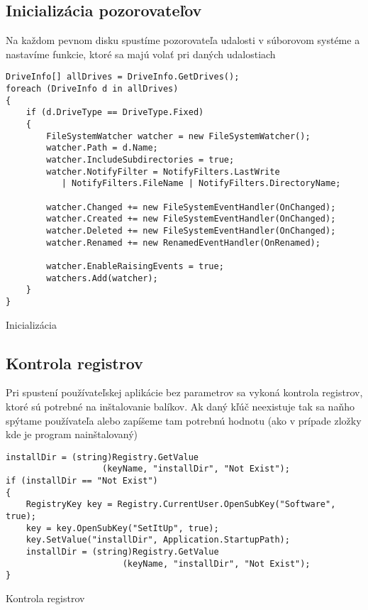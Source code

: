 \subsection{Inicializácia pozorovateľov}
Na každom pevnom disku spustíme pozorovateľa udalosti v súborovom systéme a nastavíme funkcie, ktoré sa majú volať pri daných udalostiach
\begin{listing}
\begin{verbatim}
DriveInfo[] allDrives = DriveInfo.GetDrives();
foreach (DriveInfo d in allDrives)
{
    if (d.DriveType == DriveType.Fixed) 
    { 
        FileSystemWatcher watcher = new FileSystemWatcher();
        watcher.Path = d.Name;
        watcher.IncludeSubdirectories = true;
        watcher.NotifyFilter = NotifyFilters.LastWrite
           | NotifyFilters.FileName | NotifyFilters.DirectoryName;

        watcher.Changed += new FileSystemEventHandler(OnChanged);
        watcher.Created += new FileSystemEventHandler(OnChanged);
        watcher.Deleted += new FileSystemEventHandler(OnChanged);
        watcher.Renamed += new RenamedEventHandler(OnRenamed);

        watcher.EnableRaisingEvents = true;
        watchers.Add(watcher);
    }
}         
\end{verbatim}
\caption{Inicializácia}
\label{lst:init}
\end{listing}

\subsection{Kontrola registrov}
Pri spustení používateľskej aplikácie bez parametrov sa vykoná kontrola registrov, ktoré sú potrebné na inštalovanie balíkov. Ak daný kľúč neexistuje tak sa naňho spýtame používateľa alebo zapíšeme tam potrebnú hodnotu (ako v prípade zložky kde je program nainštalovaný)

\begin{listing}
\begin{verbatim}
installDir = (string)Registry.GetValue
                   (keyName, "installDir", "Not Exist");
if (installDir == "Not Exist")
{
    RegistryKey key = Registry.CurrentUser.OpenSubKey("Software", true);
    key = key.OpenSubKey("SetItUp", true);
    key.SetValue("installDir", Application.StartupPath);
    installDir = (string)Registry.GetValue
                       (keyName, "installDir", "Not Exist");
}      
\end{verbatim}
\caption{Kontrola registrov}
\label{lst:regcheck}
\end{listing}

